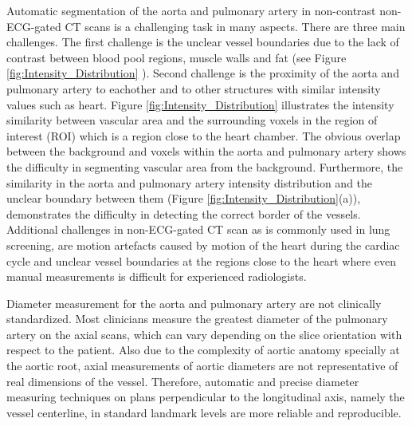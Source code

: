 Automatic segmentation of the aorta and pulmonary artery in non-contrast non-\gls{ECG}-gated \gls{CT} scans is a challenging task in many aspects. There are three main challenges. The first challenge is the unclear vessel boundaries due to the lack of contrast between blood pool regions, muscle walls and fat (see Figure \cref{fig:Intensity_Distribution} ).  Second challenge is the proximity of the aorta and pulmonary artery to eachother and to other structures with similar intensity values such as heart. Figure \cref{fig:Intensity_Distribution} illustrates the intensity similarity between vascular area and the surrounding voxels in the region of interest (ROI) which is a region close to the heart chamber. The obvious overlap between the background and voxels within the aorta and pulmonary artery shows the difficulty in segmenting vascular area from the background. Furthermore, the similarity in the aorta and pulmonary artery intensity distribution and the unclear boundary between them (Figure \cref{fig:Intensity_Distribution}(a)), demonstrates the difficulty in detecting the correct border of the vessels. Additional challenges in non-ECG-gated \gls{CT} scan as is commonly used in lung screening, are motion artefacts caused by motion of the heart during the cardiac cycle and unclear vessel boundaries at the regions close to the heart where even manual measurements is difficult for experienced radiologists.



%
%

Diameter measurement for the aorta and pulmonary artery are not clinically standardized. Most clinicians measure the greatest diameter of the pulmonary artery on the axial scans, which can vary depending on the slice orientation with respect to the patient. Also due to the complexity of aortic anatomy specially at the aortic root, axial measurements of aortic diameters are not representative of real dimensions of the vessel. Therefore, automatic and precise diameter measuring techniques on plans perpendicular to the longitudinal axis, namely the vessel centerline, in standard landmark levels are more reliable and reproducible.

